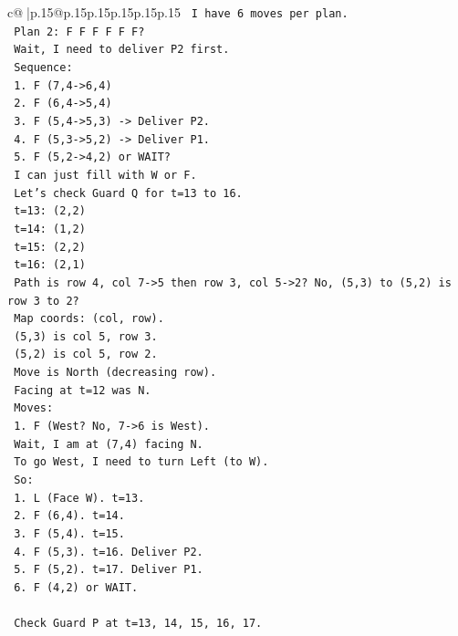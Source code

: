 \documentclass{article}
\begin{document}
{\begin{supertabular}{c@{$\;$}|p{.15\linewidth}@{}p{.15\linewidth}p{.15\linewidth}p{.15\linewidth}p{.15\linewidth}p{.15\linewidth}}
{{{\texttt{   I have 6 moves per plan.} \\
\texttt{   Plan 2: F F F F F F?} \\
\texttt{   Wait, I need to deliver P2 first.} \\
\texttt{   Sequence:} \\
\texttt{   1. F (7,4{-}>6,4)} \\
\texttt{   2. F (6,4{-}>5,4)} \\
\texttt{   3. F (5,4{-}>5,3) {-}> Deliver P2.} \\
\texttt{   4. F (5,3{-}>5,2) {-}> Deliver P1.} \\
\texttt{   5. F (5,2{-}>4,2) or WAIT?} \\
\texttt{   I can just fill with W or F.} \\
\texttt{   Let's check Guard Q for t=13 to 16.} \\
\texttt{   t=13: (2,2)} \\
\texttt{   t=14: (1,2)} \\
\texttt{   t=15: (2,2)} \\
\texttt{   t=16: (2,1)} \\
\texttt{   Path is row 4, col 7{-}>5 then row 3, col 5{-}>2? No, (5,3) to (5,2) is row 3 to 2?} \\
\texttt{   Map coords: (col, row).} \\
\texttt{   (5,3) is col 5, row 3.} \\
\texttt{   (5,2) is col 5, row 2.} \\
\texttt{   Move is North (decreasing row).} \\
\texttt{   Facing at t=12 was N.} \\
\texttt{   Moves:} \\
\texttt{   1. F (West? No, 7{-}>6 is West).} \\
\texttt{   Wait, I am at (7,4) facing N.} \\
\texttt{   To go West, I need to turn Left (to W).} \\
\texttt{   So:} \\
\texttt{   1. L (Face W). t=13.} \\
\texttt{   2. F (6,4). t=14.} \\
\texttt{   3. F (5,4). t=15.} \\
\texttt{   4. F (5,3). t=16. Deliver P2.} \\
\texttt{   5. F (5,2). t=17. Deliver P1.} \\
\texttt{   6. F (4,2) or WAIT.} \\
\\ 
\texttt{   Check Guard P at t=13, 14, 15, 16, 17.} \\
}}}
\end{supertabular}}
\end{document}
